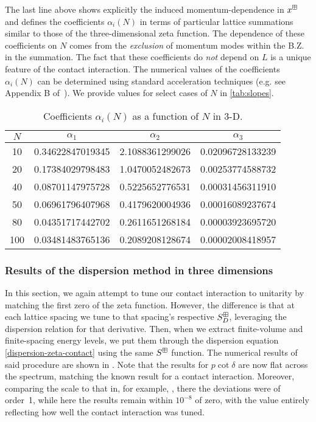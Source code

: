 The last line above shows explicitly the induced momentum-dependence in $x^\boxplus$ and defines the coefficients $\alpha_i(N)$ in terms of particular lattice summations similar to those of the three-dimensional zeta function.  The dependence of these coefficients on $N$ comes from the \emph{exclusion} of momentum modes within the B.Z. in the summation.   The fact that these coefficients do \emph{not} depend on $L$ is a unique feature of the contact interaction.  The numerical values of the coefficients $\alpha_i(N)$ can be determined using standard acceleration techniques (e.g. see Appendix B of~\cite{Luu:2011ep}).  We provide values for select cases of $N$ in \autoref{tab:slopes}.
\begin{table}
\caption{Coefficients $\alpha_i(N)$ as a function of $N$ in 3-D.\label{tab:slopes}}
\center
\begin{tabular}{c|ccc}
$N$ & $\alpha_1$ & $\alpha_2$ & $\alpha_3$ \\
\hline
10 & 0.34622847019345 &2.1088361299026 &0.02096728133239\\
20 & 0.17384029798483 &1.0470052482673 &0.00253774588732\\
40 & 0.08701147975728 &0.5225652776531 &0.00031456311910\\
50 & 0.06961796407968 &0.4179620004936 &0.00016089237674\\
80 & 0.04351717442702 &0.2611651268184 &0.00003923695720\\
100 &0.03481483765136 &0.2089208128674 &0.00002008418957
\end{tabular}
\end{table}


\subsubsection{Results of the dispersion method in three dimensions}

In this section, we again attempt to tune our contact interaction to unitarity by matching the first zero of the \Luscher zeta function.
However, the difference is that at each lattice spacing we tune to that spacing's respective $S^{\boxplus}_D$, leveraging the dispersion relation for that derivative.
Then, when we extract finite-volume and finite-spacing energy levels, we put them through the dispersion equation \eqref{dispersion-zeta-contact} using the same $S^{\boxplus}$ function.
The numerical results of said procedure are shown in .
Note that the results for $p\cot\delta$ are now flat across the spectrum, matching the known result for a contact interaction.
Moreover, comparing the scale to that in, for example, , there the deviations were of order~1, while here the results remain within $10^{-8}$ of zero, with the value entirely reflecting how well the contact interaction was tuned.

